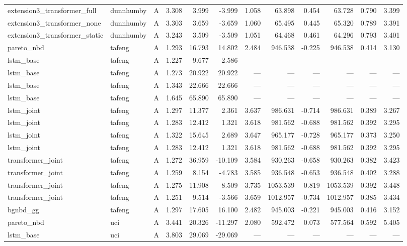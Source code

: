 \begin{table}
\begin{tabular}{lllrrrrrrrrr}
extension3_transformer_full & dunnhumby & A & 3.308 & 3.999 & -3.999 & 1.058 & 63.898 & 0.454 & 63.728 & 0.790 & 3.399 \\
extension3_transformer_none & dunnhumby & A & 3.303 & 3.659 & -3.659 & 1.060 & 65.495 & 0.445 & 65.320 & 0.789 & 3.391 \\
extension3_transformer_static & dunnhumby & A & 3.243 & 3.509 & -3.509 & 1.051 & 64.468 & 0.461 & 64.296 & 0.793 & 3.401 \\
pareto_nbd & tafeng & A & 1.293 & 16.793 & 14.802 & 2.484 & 946.538 & -0.225 & 946.538 & 0.414 & 3.130 \\
lstm_base & tafeng & A & 1.227 & 9.677 & 2.586 & — & — & — & — & — & — \\
lstm_base & tafeng & A & 1.273 & 20.922 & 20.922 & — & — & — & — & — & — \\
lstm_base & tafeng & A & 1.343 & 22.666 & 22.666 & — & — & — & — & — & — \\
lstm_base & tafeng & A & 1.645 & 65.890 & 65.890 & — & — & — & — & — & — \\
lstm_joint & tafeng & A & 1.297 & 11.377 & 2.361 & 3.637 & 986.631 & -0.714 & 986.631 & 0.389 & 3.267 \\
lstm_joint & tafeng & A & 1.283 & 12.412 & 1.321 & 3.618 & 981.562 & -0.688 & 981.562 & 0.392 & 3.295 \\
lstm_joint & tafeng & A & 1.322 & 15.645 & 2.689 & 3.647 & 965.177 & -0.728 & 965.177 & 0.373 & 3.250 \\
lstm_joint & tafeng & A & 1.283 & 12.412 & 1.321 & 3.618 & 981.562 & -0.688 & 981.562 & 0.392 & 3.295 \\
transformer_joint & tafeng & A & 1.272 & 36.959 & -10.109 & 3.584 & 930.263 & -0.658 & 930.263 & 0.382 & 3.423 \\
transformer_joint & tafeng & A & 1.259 & 8.154 & -4.783 & 3.585 & 936.548 & -0.653 & 936.548 & 0.402 & 3.288 \\
transformer_joint & tafeng & A & 1.275 & 11.908 & 8.509 & 3.735 & 1053.539 & -0.819 & 1053.539 & 0.392 & 3.448 \\
transformer_joint & tafeng & A & 1.251 & 9.514 & -3.566 & 3.659 & 1012.957 & -0.734 & 1012.957 & 0.385 & 3.434 \\
bgnbd_gg & tafeng & A & 1.297 & 17.605 & 16.100 & 2.482 & 945.003 & -0.221 & 945.003 & 0.416 & 3.152 \\
pareto_nbd & uci & A & 3.441 & 20.326 & -11.297 & 2.080 & 592.472 & 0.073 & 577.564 & 0.592 & 5.405 \\
lstm_base & uci & A & 3.803 & 29.069 & -29.069 & — & — & — & — & — & — \\

\end{tabular}
\end{table}
